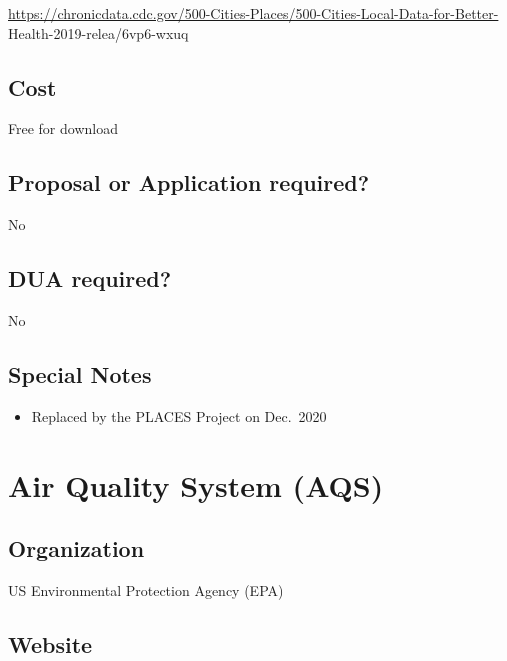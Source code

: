 \documentclass[
]{book}
\providecommand{\tightlist}{%
  \setlength{\itemsep}{0pt}\setlength{\parskip}{0pt}}
\begin{document}
\url{https://chronicdata.cdc.gov/500-Cities-Places/500-Cities-Local-Data-for-Better-} Health-2019-relea/6vp6-wxuq

\hypertarget{cost}{%
\section{Cost}\label{cost}}

Free for download

\hypertarget{proposal-or-application-required}{%
\section{Proposal or Application required?}\label{proposal-or-application-required}}

No

\hypertarget{dua-required}{%
\section{DUA required?}\label{dua-required}}

No

\hypertarget{special-notes}{%
\section{Special Notes}\label{special-notes}}

\begin{itemize}
\tightlist
\item
  Replaced by the PLACES Project on Dec.~2020
\end{itemize}

\mainmatter

\hypertarget{air-quality-system-aqs}{%
\chapter{Air Quality System (AQS)}\label{air-quality-system-aqs}}

\hypertarget{organization-1}{%
\section{Organization}\label{organization-1}}

US Environmental Protection Agency (EPA)

\hypertarget{website-1}{%
\section{Website}\label{website-1}}
\end{document}
